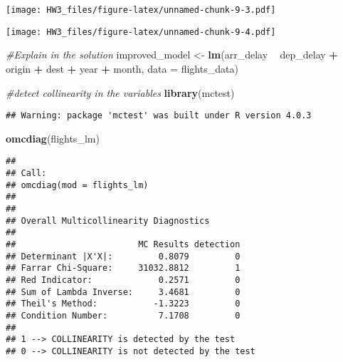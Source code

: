 \documentclass[
]{article}
\newenvironment{Shaded}{\begin{snugshade}}{\end{snugshade}}
\newcommand{\CommentTok}[1]{\textcolor[rgb]{0.56,0.35,0.01}{\textit{#1}}}
\newcommand{\DataTypeTok}[1]{\textcolor[rgb]{0.13,0.29,0.53}{#1}}
\newcommand{\KeywordTok}[1]{\textcolor[rgb]{0.13,0.29,0.53}{\textbf{#1}}}
\newcommand{\NormalTok}[1]{#1}
\newcommand{\OperatorTok}[1]{\textcolor[rgb]{0.81,0.36,0.00}{\textbf{#1}}}
\newcommand{\StringTok}[1]{\textcolor[rgb]{0.31,0.60,0.02}{#1}}
\begin{document}
\texttt{[image: HW3\_files/figure-latex/unnamed-chunk-9-3.pdf]}

\begin{Shaded}
\end{Shaded}

\texttt{[image: HW3\_files/figure-latex/unnamed-chunk-9-4.pdf]}

\begin{Shaded}
\begin{Highlighting}[]
\CommentTok{#Explain in the solution}
\NormalTok{improved_model <-}\StringTok{ }\KeywordTok{lm}\NormalTok{(arr_delay }\OperatorTok{~}\StringTok{ }\NormalTok{dep_delay }\OperatorTok{+}\StringTok{ }\NormalTok{origin }\OperatorTok{+}\StringTok{ }\NormalTok{dest }\OperatorTok{+}\StringTok{ }\NormalTok{year }\OperatorTok{+}\StringTok{ }\NormalTok{month, }\DataTypeTok{data =}\NormalTok{ flights_data)}

\CommentTok{#detect collinearity in the variables}
\KeywordTok{library}\NormalTok{(mctest)}
\end{Highlighting}
\end{Shaded}

\begin{verbatim}
## Warning: package 'mctest' was built under R version 4.0.3
\end{verbatim}

\begin{Shaded}
\begin{Highlighting}[]
\KeywordTok{omcdiag}\NormalTok{(flights_lm)}
\end{Highlighting}
\end{Shaded}

\begin{verbatim}
## 
## Call:
## omcdiag(mod = flights_lm)
## 
## 
## Overall Multicollinearity Diagnostics
## 
##                        MC Results detection
## Determinant |X'X|:         0.8079         0
## Farrar Chi-Square:     31032.8812         1
## Red Indicator:             0.2571         0
## Sum of Lambda Inverse:     3.4681         0
## Theil's Method:           -1.3223         0
## Condition Number:          7.1708         0
## 
## 1 --> COLLINEARITY is detected by the test 
## 0 --> COLLINEARITY is not detected by the test
\end{verbatim}
\end{document}
